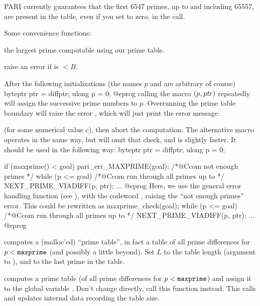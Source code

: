 PARI currently guarantees that the first 6547 primes, up to and including
65557, are present in the table, even if you set  to zero.
in the  call.

\noindent Some convenience functions:

 the largest prime computable using our prime table.

 raise an error if  is $< B$.

After the following initializations (the names $p$ and  are
arbitrary of course)
\bprog
byteptr ptr = diffptr;
ulong p = 0;
@eprog
\noindent calling the macro $(p, \hbox{\it ptr\/})$
repeatedly will assign the successive prime numbers to $p$. Overrunning the
prime table boundary will raise the error , which will just
print the error message:


\noindent (for some numerical value $c$), then abort the computation. The
alternative macro  operates in the same way, but will
omit that check, and is slightly faster. It should be used in the following
way:
%
\bprog
byteptr ptr = diffptr;
ulong p = 0;

if (maxprime() < goal) pari_err_MAXPRIME(goal); /*@Ccom not enough primes */
while (p <= goal) /*@Ccom run through all primes up to  */
{
  NEXT_PRIME_VIADIFF(p, ptr);
  ...
}
@eprog\noindent
Here, we use the general error handling function  (see
), with the codeword , raising the ``not enough
primes'' error. This could be rewritten as
\bprog
maxprime_check(goal);
while (p <= goal) /*@Ccom run through all primes up to  */
{
  NEXT_PRIME_VIADIFF(p, ptr);
  ...
}
@eprog

computes a (malloc'ed) ``prime table'', in fact a table of all prime
differences for $p < {\tt maxprime}$ (and possibly a little beyond). Set $L$
to the table length (argument to ), and  to the last
prime in the table.

 computes a prime table (of all prime
differences for $p < {\tt maxprime}$) and assign it to the global variable
. Don't change  directly, call this function
instead. This calls  and updates internal data recording the
table size.

